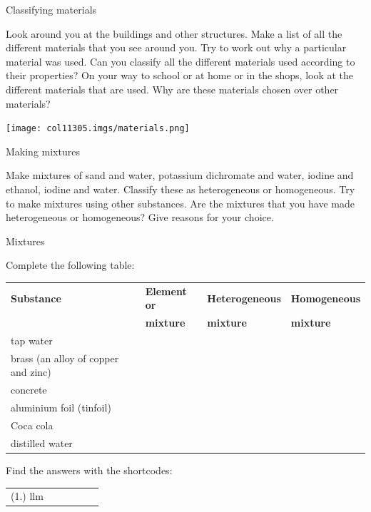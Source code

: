   \label{m38708*eip-478}\begin{activity}{Classifying materials}
{\begin{minipage}{.5\textwidth}
Look around you at the buildings and other structures. Make a list of all the different materials that you see around you. Try to work out why a particular material was used. Can you classify all the different materials used according to their properties? On your way to school or at home or in the shops, look at the different materials that are used. Why are these materials chosen over other materials?\par \label{m38708*eip-894}
\end{minipage}
\begin{minipage}{.5\textwidth}
\begin{center}
 \texttt{[image: col11305.imgs/materials.png]}\par
\end{center}
\end{minipage}
}
\end{activity}
\begin{activity}{Making mixtures}
{Make mixtures of sand and water, potassium dichromate and water, iodine and ethanol, iodine and water. Classify these as heterogeneous or homogeneous. Try to make mixtures using other substances. Are the mixtures that you have made heterogeneous or homogeneous? Give reasons for your choice. \par}
\end{activity}
\label{m38708*secfhsst!!!underscore!!!id169}
\begin{exercises}{Mixtures}
{Complete the following table: \par
\begin{tabular}{|l|l|l|l|}\hline
\textbf{Substance} & \textbf{Element or} & \textbf{Heterogeneous} & \textbf{Homogeneous} \\ 
 & \textbf{mixture} & \textbf{mixture} & \textbf{mixture} \\ \hline
tap water & & & \\ \hline
brass (an alloy of copper and zinc) & & & \\ \hline
concrete & & & \\ \hline
aluminium foil (tinfoil) & & & \\ \hline
Coca cola & & & \\ \hline
distilled water & & & \\ \hline
\end{tabular}
    \label{m38708*cid3}
\par {} Find the answers with the shortcodes:
 \par \begin{tabular}[h]{cccccc}
 (1.) llm  & \end{tabular} }
\end{exercises}
